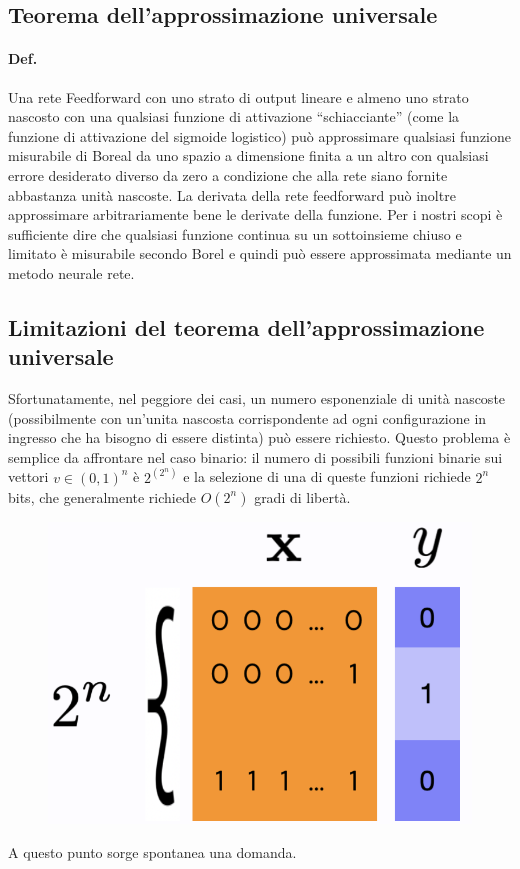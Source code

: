 \newpage
\subsection{Teorema dell’approssimazione universale}
\paragraph{Def.} Una rete Feedforward con uno strato di output lineare e almeno uno strato nascosto con una qualsiasi funzione di attivazione “schiacciante” (come la funzione di attivazione del sigmoide logistico) può approssimare qualsiasi funzione misurabile di Boreal da uno spazio a dimensione finita a un altro con qualsiasi errore desiderato diverso da zero a condizione che alla rete siano fornite abbastanza unità nascoste. La derivata della rete feedforward può inoltre approssimare arbitrariamente bene le derivate della funzione.
\newline
\newline
Per i nostri scopi è sufficiente dire che qualsiasi funzione continua su un sottoinsieme chiuso e limitato è misurabile secondo Borel e quindi può essere approssimata mediante un metodo neurale rete.

\subsection{Limitazioni del teorema dell’approssimazione universale}
Sfortunatamente, nel peggiore dei casi, un numero esponenziale di unità nascoste (possibilmente con un’unita nascosta corrispondente ad ogni configurazione in ingresso che ha bisogno di essere distinta) può essere richiesto.
\newline
\newline
Questo problema è semplice da affrontare nel caso binario: il numero di possibili funzioni binarie sui vettori $v\in(0,1)^n$ è $2^{(2^n )}$ e la selezione di una di queste funzioni richiede $2^n$ bits, che generalmente richiede $O(2^n )$ gradi di libertà.
\begin{figure}[!h]
    \includegraphics[scale=.8]{images/gradient_descent/limitation.png}
    \centering
\end{figure}
A questo punto sorge spontanea una domanda.


